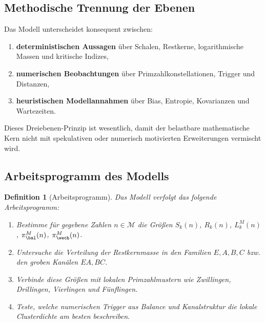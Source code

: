 \documentclass[11pt,a4paper]{article}
\newtheorem{definition}{Definition}[section]
\begin{document}
	\subsection{Methodische Trennung der Ebenen}
	
	\begin{axiom}
		\label{ax:drei_ebenen}
		Das Modell unterscheidet konsequent zwischen:
		\begin{enumerate}
			\item \textbf{deterministischen Aussagen} über Schalen, Restkerne, logarithmische Massen und kritische Indizes,
			\item \textbf{numerischen Beobachtungen} über Primzahlkonstellationen, Trigger und Distanzen,
			\item \textbf{heuristischen Modellannahmen} über Bias, Entropie, Kovarianzen und Wartezeiten.
		\end{enumerate}
	\end{axiom}
	
	\begin{bemerkung}
		Dieses Dreiebenen-Prinzip ist wesentlich, damit der belastbare mathematische Kern nicht mit spekulativen oder numerisch motivierten Erweiterungen vermischt wird.
	\end{bemerkung}
	
	\subsection{Arbeitsprogramm des Modells}
	
	\begin{definition}[Arbeitsprogramm]
		\label{def:arbeitsprogramm}
		Das Modell verfolgt das folgende Arbeitsprogramm:
		\begin{enumerate}
			\item Bestimme für gegebene Zahlen \(n\in\mathcal M\) die Größen \(S_k(n)\), \(R_k(n)\), \(L_k^M(n)\), \(\pi_{\bal}^M(n)\), \(\pi_{\wech}^M(n)\).
			\item Untersuche die Verteilung der Restkernmasse in den Familien \(E,A,B,C\) bzw. den groben Kanälen \(EA,BC\).
			\item Verbinde diese Größen mit lokalen Primzahlmustern wie Zwillingen, Drillingen, Vierlingen und Fünflingen.
			\item Teste, welche numerischen Trigger aus Balance und Kanalstruktur die lokale Clusterdichte am besten beschreiben.
		\end{enumerate}
	\end{definition}
	
\end{document}
